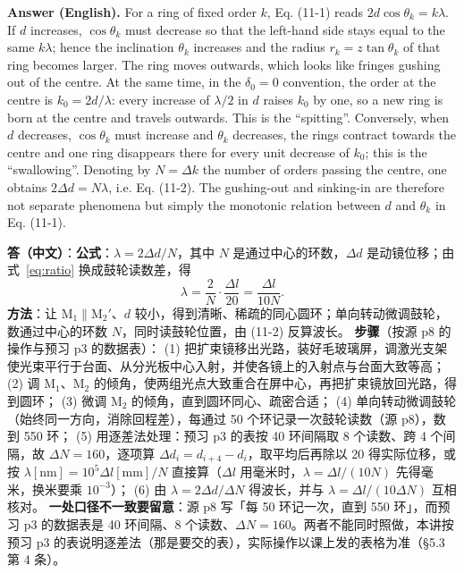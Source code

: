 \documentclass[11pt]{ctexart}
\newcommand{\Dl}{d}
\newcommand{\qaneed}[1]{\needspace{#1\textheight}}
\begin{document}
\textbf{Answer (English).} For a ring of fixed order $k$, Eq. (11-1) reads $2\Dl\cos\theta_k=k\lambda$. If $\Dl$ increases, $\cos\theta_k$ must decrease so that the left-hand side stays equal to the same $k\lambda$; hence the inclination $\theta_k$ increases and the radius $r_k=z\tan\theta_k$ of that ring becomes larger. The ring moves outwards, which looks like fringes gushing out of the centre. At the same time, in the $\delta_0=0$ convention, the order at the centre is $k_0=2\Dl/\lambda$: every increase of $\lambda/2$ in $\Dl$ raises $k_0$ by one, so a new ring is born at the centre and travels outwards. This is the ``spitting''. Conversely, when $\Dl$ decreases, $\cos\theta_k$ must increase and $\theta_k$ decreases, the rings contract towards the centre and one ring disappears there for every unit decrease of $k_0$; this is the ``swallowing''. Denoting by $N=\Delta k$ the number of orders passing the centre, one obtains $2\Delta\Dl=N\lambda$, i.e. Eq. (11-2). The gushing-out and sinking-in are therefore not separate phenomena but simply the monotonic relation between $\Dl$ and $\theta_k$ in Eq. (11-1).

\qaneed{0.86}


\textbf{答（中文）}：\textbf{公式}：$\lambda=2\Delta\Dl/N$，其中 $N$ 是通过中心的环数，$\Delta\Dl$ 是动镜位移；由式~\eqref{eq:ratio} 换成鼓轮读数差，得
\[
  \lambda=\frac{2}{N}\cdot\frac{\Delta l}{20}=\frac{\Delta l}{10N}.
\]
\textbf{方法}：让 M$_1\parallel$M$_2'$、$\Dl$ 较小，得到清晰、稀疏的同心圆环；单向转动微调鼓轮，数通过中心的环数 $N$，同时读鼓轮位置，由 (11-2) 反算波长。
\textbf{步骤}（按源 p8 的操作与预习 p3 的数据表）：
(1) 把扩束镜移出光路，装好毛玻璃屏，调激光支架使光束平行于台面、从分光板中心入射，并使各镜上的入射点与台面大致等高；
(2) 调 M$_1$、M$_2$ 的倾角，使两组光点大致重合在屏中心，再把扩束镜放回光路，得到圆环；
(3) 微调 M$_2$ 的倾角，直到圆环同心、疏密合适；
(4) 单向转动微调鼓轮（始终同一方向，消除回程差），每通过 50 个环记录一次鼓轮读数（源 p8），数到 550 环；
(5) 用逐差法处理：预习 p3 的表按 40 环间隔取 8 个读数、跨 4 个间隔，故 $\Delta N=160$，逐项算 $\Delta\Dl_i=\Dl_{i+4}-\Dl_i$，取平均后再除以 20 得实际位移，或按 $\lambda[\mathrm{nm}]=10^{5}\Delta l[\mathrm{mm}]/N$ 直接算（$\Delta l$ 用毫米时，$\lambda=\Delta l/(10N)$ 先得毫米，换米要乘 $10^{-3}$）；
(6) 由 $\lambda=2\Delta\Dl/\Delta N$ 得波长，并与 $\lambda=\Delta l/(10\Delta N)$ 互相核对。
\textbf{一处口径不一致要留意}：源 p8 写「每 50 环记一次，直到 550 环」，而预习 p3 的数据表是 40 环间隔、8 个读数、$\Delta N=160$。两者不能同时照做，本讲按预习 p3 的表说明逐差法（那是要交的表），实际操作以课上发的表格为准（§5.3 第 4 条）。
\end{document}
